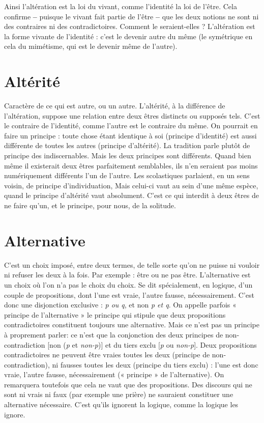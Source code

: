 Ainsi l’altération est la loi du vivant, comme l'identité la loi de l’être. Cela
confirme {\bf --} puisque le vivant fait partie de l'être {\bf --} que les deux notions ne sont
ni des contraires ni des contradictoires. Comment le seraient-elles ? L’altération
est la forme vivante de l’identité : c’est le devenir autre du même (le symétrique
en cela du mimétisme, qui est le devenir même de l’autre).

\section{Altérité}
Caractère de ce qui est autre, ou un autre. L’altérité, à la différence
de l’altération, suppose une relation entre deux êtres distincts
ou supposés tels. C’est le contraire de l'identité, comme l’autre est le
contraire du même. On pourrait en faire un principe : toute chose étant identique
à soi (principe d'identité) est aussi différente de toutes les autres (principe
d’altérité). La tradition parle plutôt de principe des indiscernables. Mais les
deux principes sont différents. Quand bien même il existerait deux êtres parfaitement
semblables, ils n’en seraient pas moins numériquement différents l’un
de l’autre. Les scolastiques parlaient, en un sens voisin, de principe d’individuation,
Mais celui-ci vaut au sein d’une même espèce, quand le principe d’altérité
vaut absolument. C’est ce qui interdit à deux êtres de ne faire qu’un, et le principe,
pour nous, de la solitude.

\section{Alternative}
C'est un choix imposé, entre deux termes, de telle sorte qu’on
ne puisse ni vouloir ni refuser les deux à la fois. Par exemple :
être ou ne pas être. L’alternative est un choix où l’on n’a pas le choix du choix.
Se dit spécialement, en logique, d’un couple de propositions, dont l’une est
vraie, l’autre fausse, nécessairement. C’est donc une disjonction exclusive : {\it p ou
q}, et non {\it p et q}. On appelle parfois « principe de l'alternative » le principe qui
stipule que deux propositions contradictoires constituent toujours une alternative.
Mais ce n’est pas un principe à proprement parler: ce n'est que la
conjonction des deux principes de non-contradiction [non ({\it p} et {\it non-p})] et du
tiers exclu [{\it p} ou {\it non-p}]. Deux propositions contradictoires ne peuvent être
vraies toutes les deux (principe de non-contradiction), ni fausses toutes les deux
(principe du tiers exclu) : l’une est donc vraie, l’autre fausse, nécessairement
(« principe » de l'alternative). On remarquera toutefois que cela ne vaut que des
propositions. Des discours qui ne sont ni vrais ni faux (par exemple une prière)
ne sauraient constituer une alternative nécessaire. C’est qu’ils ignorent la
logique, comme la logique les ignore.

